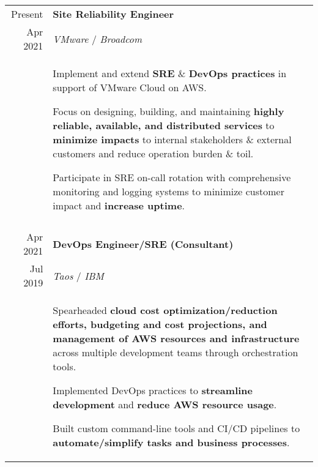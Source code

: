\documentclass[10pt]{article}
\newcommand{\afterlistspace}[0]{\vspace{-1.5em}}
\begin{document}
\begin{tabular}{r|p{16cm}}

    Present & \textbf{Site Reliability Engineer}
    \\
    Apr 2021 & \emph{VMware} / \emph{Broadcom}
    \\
    & \begin{itemize}
        \footnotesize{
            \item Implement and extend \textbf{SRE} \& \textbf{DevOps practices} in support of VMware Cloud on AWS.

            \item Focus on designing, building, and maintaining \textbf{highly reliable, available, and distributed services} to \textbf{minimize impacts} to internal stakeholders \& external customers and reduce operation burden \& toil.

            \item Participate in SRE on-call rotation with comprehensive monitoring and logging systems to minimize customer impact and \textbf{increase uptime}.
        }

        \afterlistspace
    \end{itemize}
    
    \\
    \multicolumn{2}{c}{}
    \\

    Apr 2021 & \textbf{DevOps Engineer/SRE (Consultant)}
    \\
    Jul 2019 & \emph{Taos} / \emph{IBM}
    \\
    & \begin{itemize}
        \footnotesize{
            \item Spearheaded \textbf{cloud cost optimization/reduction efforts, budgeting and cost projections, and management of AWS resources and infrastructure} across multiple development teams through orchestration tools.
            
            \item Implemented DevOps practices to \textbf{streamline development} and \textbf{reduce AWS resource usage}.
            
            \item Built custom command-line tools and CI/CD pipelines to \textbf{automate/simplify tasks and business processes}.
        }

        \afterlistspace
    \end{itemize}
    

\end{tabular}
\end{document}
